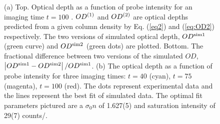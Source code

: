 \documentclass[12pt]{iopart}
\begin{document}
\begin{figure}
\caption{(a) Top. Optical depth as a function of probe intensity for an imaging time $t=100$ \us. $OD^{\rm{(1)}}$ and $OD^{\rm{(2)}}$ are optical depths predicted from a given column density by Eq. (\ref{eq2}) and (\ref{eq:OD2}) respectively.  The two versions of simulated optical depth, $OD^{\rm{sim1}}$ (green curve) and $OD^{\rm{sim2}}$ (green dots) are plotted. Bottom. The fractional difference between two versions of the simulated $OD$, $\left|OD^{\rm{sim1}}-OD^{\rm{sim2}}\right|/OD^{\rm{sim1}}$. (b) The optical depth as a function of probe intensity for three imaging times: $t=40$ \us{} (cyan),  $t=75$ \us{} (magenta),  $t=100$ \us{} (red). The dots represent experimental data and the lines represent the best fit of simulated data. The optimal fit parameters pictured are a $\sigma_0 n$ of 1.627(5) and saturation intensity of 29(7) counts/\us{}.  }
\label{fig:compareModelsAndIsat}
\end{figure}
\end{document}
